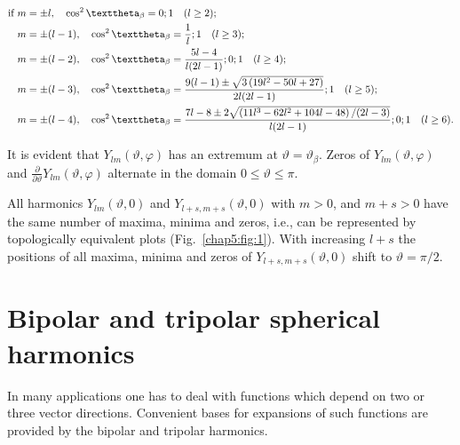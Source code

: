 \begin{align}
\text{if }m & = \pm l, \quad \cos ^{2} \vartheta_{\beta}=0 ; 1\quad(l \geq 2) ;  \notag\\
m & = \pm(l-1), \quad \cos ^{2} \vartheta_{\beta}=\frac{1}{l} ; 1\quad(l \geq 3) ;  \notag\\
m & = \pm(l-2), \quad \cos ^{2} \vartheta_{\beta}=\frac{5 l-4}{l(2 l-1)} ; 0 ; 1\quad(l \geq 4) ;  \notag\\
m & = \pm(l-3), \quad \cos ^{2} \vartheta_{\beta}=\frac{9(l-1) \pm  \sqrt{3\left(19 l^{2}-50 l+27\right)}}{2 l(2 l-1)} ; 1\quad(l \geq 5); \notag\\
m & = \pm(l-4), \quad \cos ^{2} \vartheta_{\beta}=\frac{7 l-8 \pm 2 \sqrt{\left(11 l^{3}-62 l^{2}+104 l-48\right) /(2 l-3)}}{ l(2 l-1)} ; 0 ; 1\quad(l \geq 6). \label{eq:5:15:4}
\end{align}

It is evident that $Y_{l m}(\vartheta, \varphi)$ has an extremum at $\vartheta=\vartheta_{\beta}$. Zeros of $Y_{l m}(\vartheta, \varphi)$ and $\frac{\partial}{\partial \vartheta} Y_{l m}(\vartheta, \varphi)$ alternate in the domain $0 \leq \vartheta \leq \pi$.

All harmonics $Y_{lm}(\vartheta, 0)$ and $Y_{l+s, m+s}(\vartheta, 0)$ with $m>0$, and $m+s>0$ have the same number of maxima, minima and zeros, i.e., can be represented by topologically equivalent plots (Fig.~\ref{chap5:fig:1}). With increasing $l+s$ the positions of all maxima, minima and zeros of $Y_{l+s, m+s}(\vartheta, 0)$ shift to $\vartheta=\pi / 2$.

\section{Bipolar and tripolar spherical harmonics}\label{sec:5.16}
In many applications one has to deal with functions which depend on two or three vector directions. Convenient bases for expansions of such functions are provided by the bipolar and tripolar harmonics.

